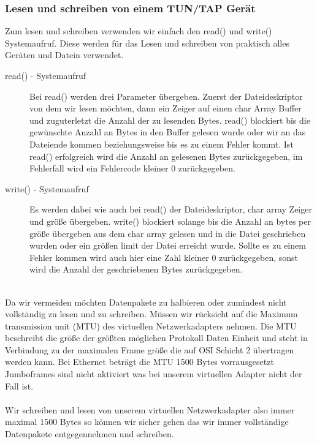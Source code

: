 \subsubsection{Lesen und schreiben von einem TUN/TAP Gerät}
Zum lesen und schreiben verwenden wir einfach den read() und write() Systemaufruf. Diese werden für das Lesen und schreiben von praktisch alles Geräten und Datein verwendet. 
\\
\begin{description}
    \item[read() - Systemaufruf] Bei read() werden drei Parameter übergeben. Zuerst der Dateideskriptor von dem wir lesen möchten, dann ein Zeiger auf einen char Array Buffer und zuguterletzt die Anzahl der zu lesenden Bytes. read() blockiert bis die gewünschte Anzahl an Bytes in den Buffer gelesen wurde oder wir an das Dateiende kommen beziehungsweise bis es zu einem Fehler kommt. Ist read() erfolgreich wird die Anzahl an gelesenen Bytes zurückgegeben, im Fehlerfall wird ein Fehlercode kleiner 0 zurückgegeben.
    \\%
    \item[write() - Systemaufruf] Es werden dabei wie auch bei read() der Dateideskriptor, char array Zeiger und größe übergeben. write() blockiert solange bis die Anzahl an bytes per größe übergeben aus dem char array gelesen und in die Datei geschrieben wurden oder ein größen limit der Datei erreicht wurde. Sollte es zu einem Fehler kommen wird auch hier eine Zahl kleiner 0 zurückgegeben, sonst wird die Anzahl der geschriebenen Bytes zurückgegeben.
\end{description}
\ \\
Da wir vermeiden möchten Datenpakete zu halbieren oder zumindest nicht vollständig zu lesen und zu schreiben. Müssen wir rücksicht auf die Maximum transmission unit (MTU) des virtuellen Netzwerkadapters nehmen. Die MTU beschreibt die größe der größten möglichen Protokoll Daten Einheit und steht in Verbindung zu der maximalen Frame größe die auf OSI Schicht 2 übertragen werden kann. Bei Ethernet beträgt die MTU 1500 Bytes vorrausgesetzt Jumboframes sind nicht aktiviert was bei unserem virtuellen Adapter nicht der Fall ist.
\\\\
Wir schreiben und lesen von unserem virtuellen Netzwerkadapter also immer maximal 1500 Bytes so können wir sicher gehen das wir immer vollständige Datenpakete entgegennehmen und schreiben.
